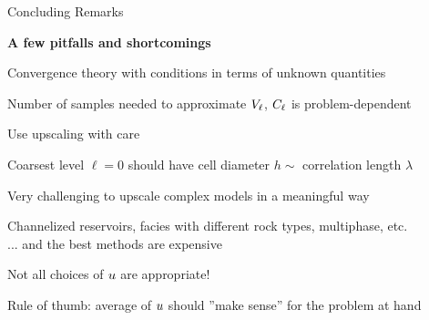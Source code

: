 \def\name{Concluding Remarks}

\begin{frame}{\name{}}

    \textbf{A few pitfalls and shortcomings}\vskip2mm
    \begin{squarelist}
        \item<2-> Convergence theory with conditions in terms of unknown quantities
        \begin{circlelist}
            \item Number of samples needed to approximate $V_\ell$, $C_\ell$ is problem-dependent
        \end{circlelist}
        \item<3-> Use upscaling with care
        \begin{circlelist}
            \item Coarsest level $\ell = 0$ should have cell diameter $h \sim$ correlation length $\lambda$
        \end{circlelist}
        \item<4-> Very challenging to upscale complex models in a meaningful way
        \begin{circlelist}
            \item Channelized reservoirs, facies with different rock types, multiphase, etc. \\
            ... and the best methods are expensive
        \end{circlelist}
        \item<5-> Not all choices of $u$ are appropriate!
        \begin{circlelist}
            \item Rule of thumb: average of $u$ should ''make sense'' for the problem at hand
        \end{circlelist}
    \end{squarelist}
    
\end{frame}

